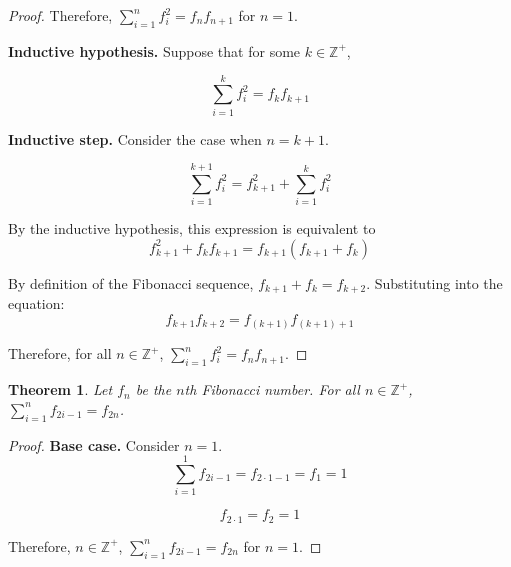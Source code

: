 \documentclass{article}
\newtheorem{theorem}{Theorem}
\numberwithin{subcase}{case}
\begin{document}
\begin{outline}[enumerate]
\begin{proof}
        Therefore, $\sum^{n}_{i=1} f_i^2 = f_nf_{n+1}$ for $n = 1$.

        \textbf{Inductive hypothesis.} Suppose that for some $k \in \mathbb{Z}^+$,

        \begin{equation}
            \sum^{k}_{i=1} f_i^2 = f_kf_{k+1}
        \end{equation}

        \textbf{Inductive step.} Consider the case when $n = k + 1$.

        \begin{equation}
            \sum^{k + 1}_{i=1} f_i^2 = f_{k+1}^2 + \sum^{k}_{i=1} f_i^2
        \end{equation}

        By the inductive hypothesis, this expression is equivalent to
        \begin{equation}
            f_{k+1}^2 + f_k f_{k + 1} = f_{k + 1}\left(f_{k + 1} + f_k\right)
        \end{equation}

        By definition of the Fibonacci sequence, $f_{k + 1} + f_k = f_{k+2}$. Substituting into 
        the equation:
        \begin{equation}
            f_{k + 1}f_{k+2} = f_{(k + 1)}f_{(k + 1) + 1}
        \end{equation}

        Therefore, for all $n \in \mathbb{Z}^+$, $\sum^{n}_{i=1} f_i^2 = f_nf_{n+1}$.

    \end{proof}

    \1 \begin{theorem}
        Let $f_n$ be the $n$th Fibonacci number. For all $n \in \mathbb{Z}^+$, $\sum^{n}_{i=1} f_{2i-1} = f_{2n}$.
    \end{theorem}

    \begin{proof}
        \textbf{Base case.} Consider $n = 1$. 
        \begin{equation}
            \sum^{1}_{i=1} f_{2i-1} = f_{2\cdot 1 - 1} = f_1 = 1
        \end{equation}

        \begin{equation}
            f_{2\cdot 1} = f_2 = 1
        \end{equation}

        Therefore, $n \in \mathbb{Z}^+$, $\sum^{n}_{i=1} f_{2i-1} = f_{2n}$ for $n = 1$.


\end{proof}
\end{outline}
\end{document}
